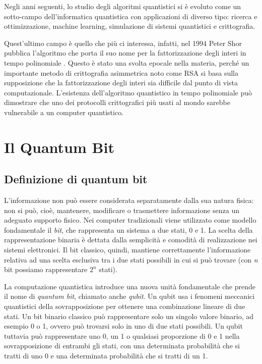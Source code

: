 Negli anni seguenti, lo studio degli algoritmi quantistici si è evoluto come un sotto-campo dell'informatica quantistica con applicazioni di diverso tipo: ricerca e ottimizzazione, machine learning, simulazione di sistemi quantistici e crittografia.

Quest'ultimo campo è quello che più ci interessa, infatti, nel 1994 Peter Shor pubblica l'algoritmo che porta il suo nome per la fattorizzazione degli interi in tempo polinomiale \cite{breaking-rsa}. Questo è stato una svolta epocale nella materia, perché un importante metodo di crittografia asimmetrica noto come RSA si basa sulla supposizione che la fattorizzazione degli interi sia difficile dal punto di vista computazionale. L'esistenza dell'algoritmo quantistico in tempo polinomiale può dimostrare che uno dei protocolli crittografici più usati al mondo sarebbe vulnerabile a un computer quantistico.

\section{Il Quantum Bit}
\subsection{Definizione di quantum bit}
L'informazione non può essere considerata separatamente dalla sua natura fisica: non si può, cioè, mantenere, modificare o trasmettere informazione senza un adeguato supporto fisico. Nei computer tradizionali viene utilizzato come modello fondamentale il \textit{bit}, che rappresenta un sistema a due stati, 0 e 1. La scelta della rappresentazione binaria è dettata dalla semplicità e comodità di realizzazione nei sistemi elettronici. Il bit classico, quindi, mantiene correttamente l'informazione relativa ad una scelta esclusiva tra i due stati possibili in cui si può trovare (con \textit{n} bit possiamo rappresentare \(2^n\) stati).

La computazione quantistica introduce una nuova unità fondamentale che prende il nome di \textit{quantum bit}, chiamato anche \textit{qubit}. Un qubit usa i fenomeni meccanici quantistici della sovrapposizione per ottenere una combinazione lineare di due stati. Un bit binario classico può rappresentare solo un singolo valore binario, ad esempio 0 o 1, ovvero può trovarsi solo in uno di due stati possibili. Un qubit tuttavia può rappresentare uno 0, un 1 o qualsiasi proporzione di 0 e 1 nella sovrapposizione di entrambi gli stati, con una determinata probabilità che si tratti di uno 0 e una determinata probabilità che si tratti di un 1.

